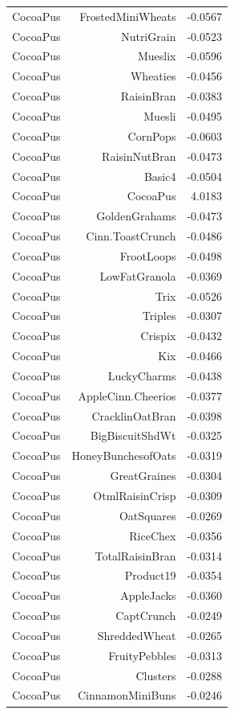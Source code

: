 \begin{longtable}{@{}lrr@{}}
CocoaPus & FrostedMiniWheats & -0.0567 \\
CocoaPus & NutriGrain & -0.0523 \\
CocoaPus & Mueslix & -0.0596 \\
CocoaPus & Wheaties & -0.0456 \\
CocoaPus & RaisinBran & -0.0383 \\
CocoaPus & Muesli & -0.0495 \\
CocoaPus & CornPops & -0.0603 \\
CocoaPus & RaisinNutBran & -0.0473 \\
CocoaPus & Basic4 & -0.0504 \\
CocoaPus & CocoaPus & 4.0183 \\
CocoaPus & GoldenGrahams & -0.0473 \\
CocoaPus & Cinn.ToastCrunch & -0.0486 \\
CocoaPus & FrootLoops & -0.0498 \\
CocoaPus & LowFatGranola & -0.0369 \\
CocoaPus & Trix & -0.0526 \\
CocoaPus & Triples & -0.0307 \\
CocoaPus & Crispix & -0.0432 \\
CocoaPus & Kix & -0.0466 \\
CocoaPus & LuckyCharms & -0.0438 \\
CocoaPus & AppleCinn.Cheerios & -0.0377 \\
CocoaPus & CracklinOatBran & -0.0398 \\
CocoaPus & BigBiscuitShdWt & -0.0325 \\
CocoaPus & HoneyBunchesofOats & -0.0319 \\
CocoaPus & GreatGraines & -0.0304 \\
CocoaPus & OtmlRaisinCrisp & -0.0309 \\
CocoaPus & OatSquares & -0.0269 \\
CocoaPus & RiceChex & -0.0356 \\
CocoaPus & TotalRaisinBran & -0.0314 \\
CocoaPus & Product19 & -0.0354 \\
CocoaPus & AppleJacks & -0.0360 \\
CocoaPus & CaptCrunch & -0.0249 \\
CocoaPus & ShreddedWheat & -0.0265 \\
CocoaPus & FruityPebbles & -0.0313 \\
CocoaPus & Clusters & -0.0288 \\
CocoaPus & CinnamonMiniBuns & -0.0246 \\

\end{longtable}
